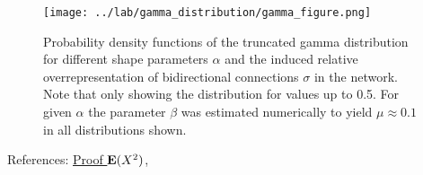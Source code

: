 \begin{figure}[h!]
\centering
\texttt{[image: ../lab/gamma\_distribution/gamma\_figure.png]}
\caption{Probability density functions of the truncated gamma distribution for different shape parameters $\alpha$ and the induced relative overrepresentation of bidirectional connections $\sigma$ in the network. Note that only showing the distribution for values up to 0.5. For given $\alpha$ the parameter $\beta$ was estimated numerically to yield $\mu \approx 0.1$ in all distributions shown.}
\end{figure}


References: \href{http://herbsusmann.com/distributions/gamma-distribution-variance-proof.html}{Proof $\operatorname{\mathbf{E}}(X^2)$}, 


